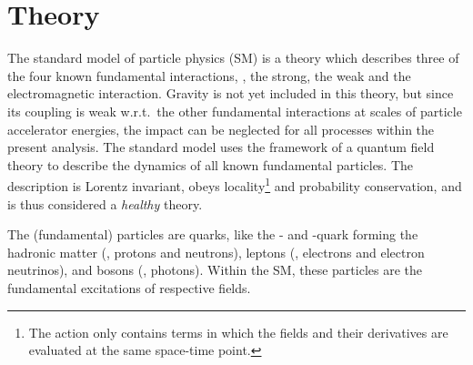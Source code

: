 \chapter{Theory}
\label{chap:theory}
The standard model of particle physics (SM) is a theory which describes three of the four known fundamental interactions, \ie{}, the strong, the weak and the electromagnetic interaction.
Gravity is not yet included in this theory, but since its coupling is weak w.r.t.\ the other fundamental interactions at scales of particle accelerator energies, the impact can be neglected for all processes within the present analysis.
The standard model uses the framework of a quantum field theory to describe the dynamics of all known fundamental particles.
The description is Lorentz invariant, obeys locality\footnote{The action only contains terms in which the fields and their derivatives are evaluated at the same space-time point.} and probability conservation, and is thus considered a \textit{healthy} theory.


The (fundamental) particles are quarks, like the \uquark- and \dquark-quark forming the hadronic matter (\eg{}, protons and neutrons), leptons (\eg{}, electrons and electron neutrinos), and bosons (\eg{}, photons).
Within the SM, these particles are the fundamental excitations of respective fields.

